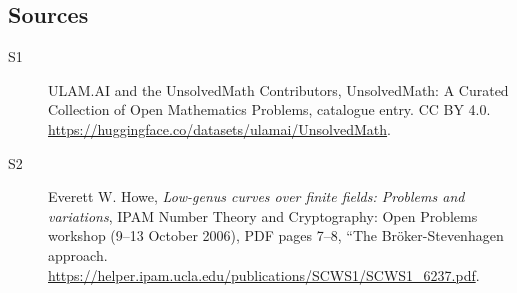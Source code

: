 \documentclass[11pt]{article}
\begin{document}
\subsection{Sources}
\begin{description}
\item[\hypertarget{source:statement:1}{S1}] ULAM.AI and the UnsolvedMath Contributors, UnsolvedMath: A Curated Collection of Open Mathematics Problems, catalogue entry. CC BY 4.0. \url{https://huggingface.co/datasets/ulamai/UnsolvedMath}.
\item[\hypertarget{source:statement:2}{S2}] Everett W. Howe, \emph{Low-genus curves over finite fields: Problems and variations}, IPAM Number Theory and Cryptography: Open Problems workshop (9--13 October 2006), PDF pages 7--8, ``The Bröker-Stevenhagen approach. \url{https://helper.ipam.ucla.edu/publications/SCWS1/SCWS1_6237.pdf}.
\end{description}
\label{end:statement}
\end{document}
